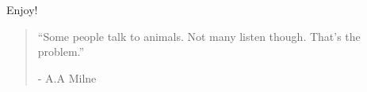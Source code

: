 \documentclass[smalldemyvopaper,11pt,twoside,onecolumn,openright,extrafontsizes]{memoir}
\begin{document}




Enjoy!



\clearpage
\tableofcontents*

\clearpage


	

\clearpage

\vspace*{4.3cm}
\begin{localsize}{10}
  \begin{quote}
    “Some people talk to animals. Not many listen though. That's the problem.”
    \begin{flushright}- A.A Milne \end{flushright}
  \end{quote} 
\end{localsize}
\vspace{1cm}






\end{document}

